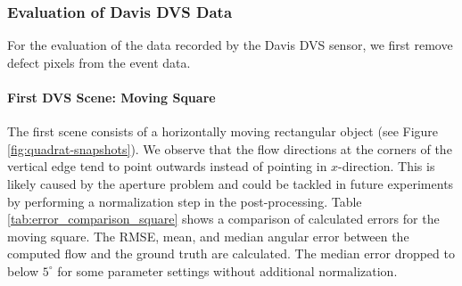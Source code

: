 \subsubsection{Evaluation of Davis DVS Data}
For the evaluation of the data recorded by the Davis DVS sensor, we first remove defect pixels from the event data.

\paragraph{First DVS Scene: Moving Square}
The first scene consists of a horizontally moving rectangular object (see Figure \ref{fig:quadrat-snapshots}).
We observe that the flow directions at the corners of the vertical edge tend to point outwards instead of pointing in $x$-direction. 
This is likely caused by the aperture problem and could be tackled in future experiments by performing a normalization step in the post-processing.
Table \ref{tab:error_comparison_square} shows a comparison of calculated errors for the moving square. The RMSE, mean, and median angular error between the computed flow and the ground truth are calculated. 
The median error dropped to below $5^\circ$ for some parameter settings without additional normalization. 


